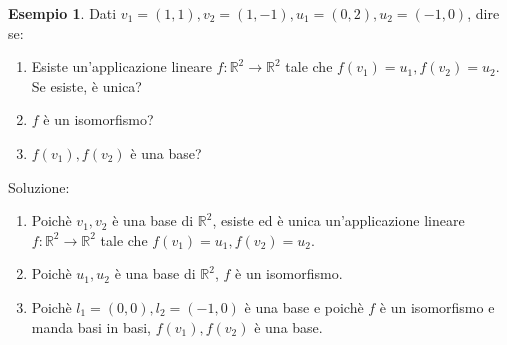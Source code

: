 \documentclass[a4paper]{article}
\theoremstyle{definition}
\newtheorem*{es}{Esempio}
\begin{document}
\begin{es}
	Dati $v_1 = (1, 1), v_2 = (1, -1), u_1 = (0, 2), u_2 = (-1, 0)$, dire se:
	\begin{enumerate}
		\item Esiste un'applicazione lineare $f: \mathbb{R}^2 \rightarrow \mathbb{R}^2$ tale che $f(v_1) = u_1, f(v_2) = u_2$. Se esiste, è unica?
		\item $f$ è un isomorfismo?
		\item $f(v_1), f(v_2)$ è una base?
	\end{enumerate}
	Soluzione:
	\begin{enumerate}
		\item Poichè $v_1, v_2$ è una base di $\mathbb{R}^2$, esiste ed è unica un'applicazione lineare $f: \mathbb{R}^2 \rightarrow \mathbb{R}^2$ tale che $f(v_1) = u_1, f(v_2) = u_2$.
		\item Poichè $u_1, u_2$ è una base di $\mathbb{R}^2$, $f$ è un isomorfismo.
		\item Poichè $l_1 = (0, 0), l_2 = (-1, 0)$ è una base e poichè $f$ è un isomorfismo e manda basi in basi, $f(v_1), f(v_2)$ è una base.
	\end{enumerate}
\end{es}
\end{document}

